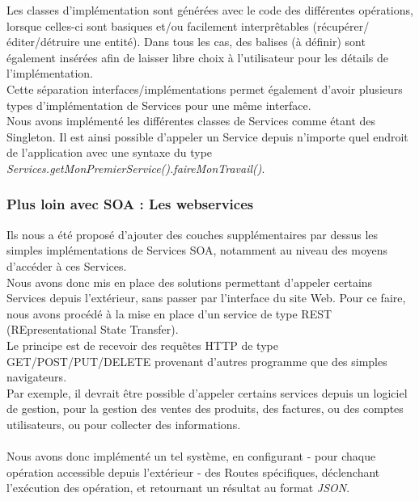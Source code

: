 Les classes d'implémentation sont générées avec le code des différentes opérations, lorsque celles-ci sont basiques et/ou facilement interprêtables (récupérer/éditer/détruire une entité). Dans tous les cas, des balises  (à définir) sont également insérées afin de laisser libre choix à l'utilisateur pour les détails de l'implémentation.\\
Cette séparation interfaces/implémentations permet également d'avoir plusieurs types d'implémentation de Services pour une même interface.\\
Nous avons implémenté les différentes classes de Services comme étant des Singleton. Il est ainsi possible d'appeler un Service depuis n'importe quel endroit de l'application avec une syntaxe du type \textit{Services.getMonPremierService().faireMonTravail()}.

\subsubsection{Plus loin avec SOA : Les webservices}

Ils nous a été proposé d'ajouter des couches supplémentaires par dessus les simples implémentations de Services SOA, notamment au niveau des moyens d'accéder à ces Services.\\
Nous avons donc mis en place des solutions permettant d'appeler certains Services depuis l'extérieur, sans passer par l'interface du site Web. Pour ce faire, nous avons procédé à la mise en place d'un service de type REST (REpresentational State Transfer).\\
Le principe est de recevoir des requêtes HTTP de type GET/POST/PUT/DELETE provenant d'autres programme que des simples navigateurs. \\
Par exemple, il devrait être possible d'appeler certains services depuis un logiciel de gestion, pour la gestion des ventes des produits, des factures, ou des comptes utilisateurs, ou pour collecter des informations.
\\\\
Nous avons donc implémenté un tel système, en configurant - pour chaque opération accessible depuis l'extérieur - des Routes spécifiques, déclenchant l'exécution des opération, et retournant un résultat au format \textit{JSON}.

\clearpage
